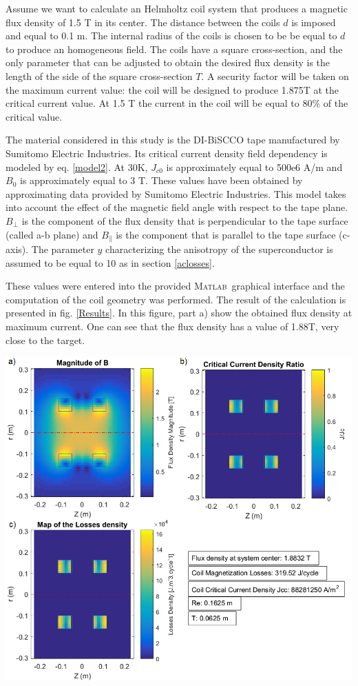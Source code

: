 \documentclass{ws-jmrr}
\newcommand{\MATLAB}{\textsc{Matlab}}
\begin{document}
\begin{multicols}{2}
Assume we want to calculate an Helmholtz coil system that produces a magnetic flux density of 1.5 T in its center. The
distance between the coils $d$ is imposed and equal to 0.1 m. The internal radius of the coils is chosen to be be equal to $d$ to produce an homogeneous field. The coils have a square cross-section, and the only parameter that can be adjusted to obtain the desired flux density is the length of the side of the square cross-section $T$. A security factor will be taken on the maximum current value: the coil will be designed to produce 1.875T at the critical current value. At 1.5 T the current in the coil will be equal to 80\% of the critical value.\par
The material considered in this study is the DI-BiSCCO tape manufactured by Sumitomo Electric Industries. Its critical current density field dependency is modeled by eq. \ref{model2}. At 30K, $J_{c0}$ is approximately equal to 500e6 A/m and $B_0$ is approximately equal to 3 T. These values have been obtained by approximating data provided by Sumitomo Electric Industries. This model takes into account the effect of the magnetic field angle with respect to the tape plane. $B_{\perp}$ is the component of the flux density that is perpendicular to the tape surface (called a-b plane) and $B_{\parallel}$ is the component that is parallel to the tape surface (c-axis). The parameter $y$ characterizing the anisotropy of the superconductor is assumed to be equal to 10 as in section \ref{aclosses}.\par
These values were entered into the provided \MATLAB ~graphical interface and the computation of the coil geometry was performed. The result of the calculation is presented in fig. \ref{Results}. In this figure, part a) show the obtained flux density at maximum current. One can see that the flux density has a value of 1.88T, very close to the target.
\begin{figurehere}
	\begin{center}
	\includegraphics[width=\linewidth]{SimResults.png}

\end{center}
\end{figurehere}
\end{multicols}
\end{document}
